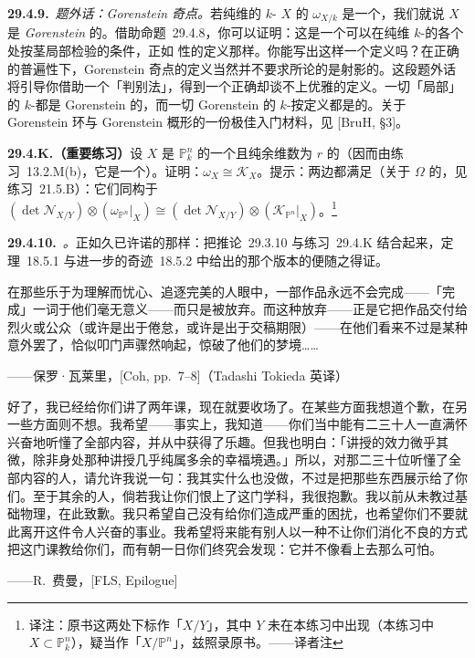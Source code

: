 \textbf{29.4.9.}\ \emph{题外话：Gorenstein 奇点。}\quad 若纯维的 \trCM{} \trProjective{} $k$-\trScheme{} $X$ 的 $\omega_{X/k}$ 是一个\trInvertibleSheaf，我们就说 $X$ 是 \emph{Gorenstein} 的。借助\mbox{命题~29.4.8}，你可以证明：这是一个可以在纯维\trProjective{} $k$-\trScheme{}的各个\trClosedPoint{}处按茎局部检验的条件，正如 \trCM{}性的定义那样。你能写出这样一个定义吗？在正确的普遍性下，Gorenstein 奇点的定义当然并不要求所论的\trScheme{}是射影的。这段题外话将引导你借助一个「\trSlicing{}判别法」，得到一个正确却谈不上优雅的定义。一切「局部\trCompleteIntersection」的 $k$-\trScheme{}都是 Gorenstein 的，而一切 Gorenstein 的 $k$-\trScheme{}按定义都是\trCM{}的。关于 Gorenstein 环与 Gorenstein 概形的一份极佳入门材料，见 [BruH, §3]。

\textbf{29.4.K.（重要练习）}\quad 设 $X$ 是 $\mathbb{P}^n_k$ 的一个\trSmooth{}且纯余维数为 $r$ 的\trSubvariety（因而由\mbox{练习~13.2.M(b)}，它是一个\trRegularEmbedding）。证明：$\omega_X\cong\mathscr{K}_X$。提示：两边都满足\trAdjunctionFormula（关于 $\Omega$ 的\trAdjunctionFormula，见\mbox{练习~21.5.B}）：它们同构于 $(\det\mathscr{N}_{X/Y})\otimes(\omega_{\mathbb{P}^n}|_X)\cong(\det\mathscr{N}_{X/Y})\otimes(\mathscr{K}_{\mathbb{P}^n}|_X)$。\footnote{译注：原书这两处下标作「$X/Y$」，其中 $Y$ 未在本练习中出现（本练习中 $X\subset\mathbb{P}^n_k$），疑当作「$X/\mathbb{P}^n$」，兹照录原书。——译者注}

\textbf{29.4.10.}\ \emph{\trhRemark{}。}\quad 正如久已许诺的那样：把\mbox{推论~29.3.10} 与\mbox{练习~29.4.K} 结合起来，\mbox{定理~18.5.1} 与\mbox{进一步的奇迹~18.5.2} 中给出的那个版本的\trSerreDuality{}便随之得证。


\epigraph{在那些乐于为理解而忧心、追逐完美的人眼中，一部作品永远不会完成——「完成」一词于他们毫无意义——而只是被放弃。而这种放弃——正是它把作品交付给烈火或公众（或许是出于倦怠，或许是出于交稿期限）——在他们看来不过是某种意外罢了，恰似叩门声骤然响起，惊破了他们的梦境……}{——保罗·瓦莱里，[Coh, pp.~7--8]（Tadashi Tokieda 英译）}

\epigraph{好了，我已经给你们讲了两年课，现在就要收场了。在某些方面我想道个歉，在另一些方面则不想。我希望——事实上，我知道——你们当中能有二三十人一直满怀兴奋地听懂了全部内容，并从中获得了乐趣。但我也明白：「讲授的效力微乎其微，除非身处那种讲授几乎纯属多余的幸福境遇。」所以，对那二三十位听懂了全部内容的人，请允许我说一句：我其实什么也没做，不过是把那些东西展示给了你们。至于其余的人，倘若我让你们恨上了这门学科，我很抱歉。我以前从未教过基础物理，在此致歉。我只希望自己没有给你们造成严重的困扰，也希望你们不要就此离开这件令人兴奋的事业。我希望将来能有别人以一种不让你们消化不良的方式把这门课教给你们，而有朝一日你们终究会发现：它并不像看上去那么可怕。}{——R.~费曼，[FLS, Epilogue]}

